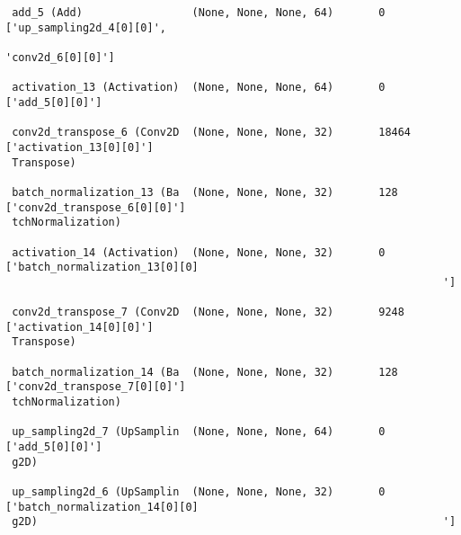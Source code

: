 \documentclass[
  letterpaper,
  DIV=11,
  numbers=noendperiod]{scrreprt}
\begin{document}
\begin{verbatim}
 add_5 (Add)                 (None, None, None, 64)       0         ['up_sampling2d_4[0][0]',     
                                                                     'conv2d_6[0][0]']            
                                                                                                  
 activation_13 (Activation)  (None, None, None, 64)       0         ['add_5[0][0]']               
                                                                                                  
 conv2d_transpose_6 (Conv2D  (None, None, None, 32)       18464     ['activation_13[0][0]']       
 Transpose)                                                                                       
                                                                                                  
 batch_normalization_13 (Ba  (None, None, None, 32)       128       ['conv2d_transpose_6[0][0]']  
 tchNormalization)                                                                                
                                                                                                  
 activation_14 (Activation)  (None, None, None, 32)       0         ['batch_normalization_13[0][0]
                                                                    ']                            
                                                                                                  
 conv2d_transpose_7 (Conv2D  (None, None, None, 32)       9248      ['activation_14[0][0]']       
 Transpose)                                                                                       
                                                                                                  
 batch_normalization_14 (Ba  (None, None, None, 32)       128       ['conv2d_transpose_7[0][0]']  
 tchNormalization)                                                                                
                                                                                                  
 up_sampling2d_7 (UpSamplin  (None, None, None, 64)       0         ['add_5[0][0]']               
 g2D)                                                                                             
                                                                                                  
 up_sampling2d_6 (UpSamplin  (None, None, None, 32)       0         ['batch_normalization_14[0][0]
 g2D)                                                               ']                            
                                                                                                  

\end{verbatim}
\end{document}
